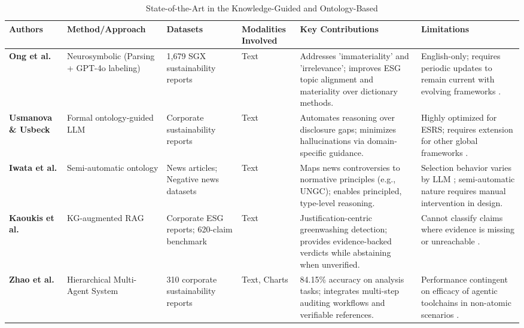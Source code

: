 \begin{landscape}
\begin{table}[p]
\centering
\caption{State-of-the-Art in the Knowledge-Guided and Ontology-Based}
\label{tab:knowledge-guided-ontology-based}
\small
\renewcommand{\arraystretch}{1.2}
\begin{tabularx}{\linewidth}{|p{1.8cm}|p{3cm}|p{3cm}|p{1.8cm}|X|X|}
\hline
Authors & Method/Approach & Datasets & Modalities Involved & Key Contributions & Limitations \\ \hline
\textbf{Ong et al. } \parencite{keane_ong_8fec4760} & Neurosymbolic (Parsing + GPT-4o labeling) & 1,679 SGX sustainability reports & Text & Addresses 'immateriality' and 'irrelevance'; improves ESG topic alignment and materiality over dictionary methods. & English-only; requires periodic updates to remain current with evolving frameworks  \parencite{keane_ong_8fec4760}. \\ \hline
\textbf{Usmanova \& Usbeck } \parencite{aida_usmanova_e9b44e1d} & Formal ontology-guided LLM & Corporate sustainability reports & Text & Automates reasoning over disclosure gaps; minimizes hallucinations via domain-specific guidance. & Highly optimized for ESRS; requires extension for other global frameworks  \parencite{aida_usmanova_e9b44e1d}. \\ \hline
\textbf{Iwata et al. } \parencite{tsuyoshi_iwata_18ccc0b8} & Semi-automatic ontology & News articles; Negative news datasets & Text & Maps news controversies to normative principles (e.g., UNGC); enables principled, type-level reasoning. & Selection behavior varies by LLM  \parencite{tsuyoshi_iwata_18ccc0b8}; semi-automatic nature requires manual intervention in design. \\ \hline
\textbf{Kaoukis et al. } \parencite{kaoukis__georgios_35bab107} & KG-augmented RAG & Corporate ESG reports; 620-claim benchmark  \parencite{georgios_kaoukis_91737dd6} & Text & Justification-centric greenwashing detection; provides evidence-backed verdicts while abstaining when unverified. & Cannot classify claims where evidence is missing or unreachable  \parencite{kaoukis__georgios_35bab107}. \\ \hline
\textbf{Zhao et al. } \parencite{yilei_zhao_b7bbd9c8} & Hierarchical Multi-Agent System & 310 corporate sustainability reports & Text, Charts & 84.15\% accuracy on analysis tasks; integrates multi-step auditing workflows and verifiable references. & Performance contingent on efficacy of agentic toolchains in non-atomic scenarios  \parencite{yilei_zhao_b7bbd9c8}. \\ \hline

\end{tabularx}
\end{table}
\end{landscape}
